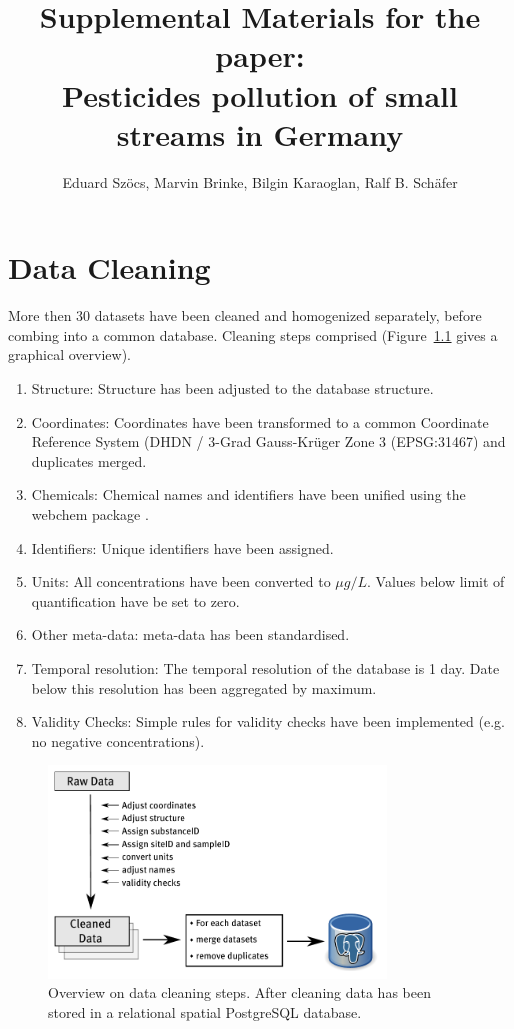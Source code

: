 \documentclass[pdftex,a4paper]{scrreprt}
\title{Supplemental Materials for the paper: \\Pesticides pollution of small streams in
Germany}
\author{Eduard Szöcs, Marvin Brinke, Bilgin Karaoglan, Ralf B. Schäfer}
\begin{document}
\maketitle

\tableofcontents
\listoffigures
\listoftables


\chapter{Data Cleaning}
More then 30 datasets have been cleaned and homogenized separately, before combing into a common database.
Cleaning steps comprised (Figure~\ref{fig:data_cleaning} gives a graphical overview).

\begin{enumerate}
	\item Structure: Structure has been adjusted to the database structure.
	\item Coordinates: Coordinates have been transformed to a common Coordinate Reference System (DHDN / 3-Grad Gauss-Krüger Zone 3 (EPSG:31467) and duplicates merged.
	\item Chemicals: Chemical names and identifiers have been unified using the webchem package \citep{szocs_webchem:_2016}.
	\item  Identifiers: Unique identifiers have been assigned.
	\item Units: All concentrations have been converted to $\mu g/L$. Values below limit of quantification have be set to zero.
	\item Other meta-data: meta-data has been standardised.
	\item Temporal resolution: The temporal resolution of the database is 1 day. Date below this resolution has been aggregated by maximum.
	\item Validity Checks: Simple rules for validity checks have been implemented (e.g. no negative concentrations).
\end{enumerate}


\begin{figure}[h]
	\centering
	\includegraphics[width = 0.8\textwidth]{data_cleaning}
	\caption[Overview on data cleaning steps.]{Overview on data cleaning steps. After cleaning data has been stored in a relational spatial PostgreSQL database.}
	\label{fig:data_cleaning}
\end{figure}
\end{document}
